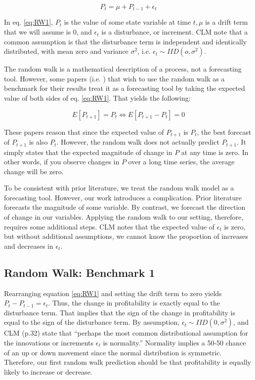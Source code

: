 \begin{equation}
\label{eq:RW1}
P_t = \mu + P_{t-1} + \epsilon_t 
\end{equation}

\noindent In eq. \ref{eq:RW1}, \(P_t\) is the value of some state variable at time \(t, \mu\) is a drift term that we will assume is 0, and \(\epsilon_t\) is a disturbance, or increment.  CLM note that a common assumption is that the disturbance term is independent and identically distributed, with mean zero and variance \(\sigma^2\),  i.e.  \( \epsilon_t \sim IID(o,\sigma^2)\). 

The random walk is a mathematical description of a process, not a forecasting tool. However, some papers (i.e.  \cite{Bradshaw}) that wish to use the random walk as a benchmark for their results treat it as a forecasting tool by taking the expected value of both sides of eq.  \ref{eq:RW1}. That yields the following:

\begin{equation}
\label{eq:RW2}
E[P_{t+1}] = P_t \Leftrightarrow E[P_{t+1} - P_t] = 0
\end{equation}

\noindent These papers reason that since the expected value of \(P_{t+1}\) is \(P_t\), the best forecast of \(P_{t+1}\) is also \(P_t\). However, the random walk does not actually predict \(P_{t+1}\). It simply states that the expected magnitude of change in \(P\) at any time is zero. In other words, if you observe changes in \(P\) over a long time series, the average change will be zero.

To be consistent with prior literature, we treat the random walk model as a forecasting tool. However, our work introduces a complication. Prior literature forecasts the magnitude of some variable. By contrast, we forecast the direction of change in our variables. Applying the random walk to our setting, therefore, requires some additional steps. CLM notes that the expected value of \(\epsilon_t\) is zero, but without additional assumptions, we cannot know the proportion of increases and decreases in \(\epsilon_t\).

\subsection{Random Walk: Benchmark 1}

Rearranging equation \ref{eq:RW1} and setting the drift term to zero yields \(P_t - P_{t-1} = \epsilon_t\). Thus, the change in profitability is exactly equal to the disturbance term. That implies that the sign of the change in profitability is equal to the sign of the disturbance term. By assumption,  \(\epsilon_t \sim IID(0,\sigma^2)\), and CLM (p.32) state that “perhaps the most common distributional assumption for the innovations or increments \(\epsilon_t\) is normality.” Normality implies a 50-50 chance of an up or down movement since the normal distribution is symmetric. Therefore, our first random walk prediction should be that profitability is equally likely to increase or decrease.

